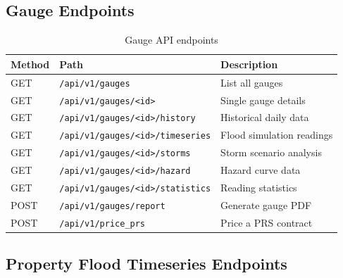 \documentclass[11pt,a4paper]{article}
\begin{document}
\subsection{Gauge Endpoints}

\begin{table}[H]
    \centering
    \caption{Gauge API endpoints}
    \begin{tabular}{@{}lll@{}}
        \toprule
        \textbf{Method} & \textbf{Path} & \textbf{Description} \\
        \midrule
        GET  & \texttt{/api/v1/gauges}                       & List all gauges \\
        GET  & \texttt{/api/v1/gauges/<id>}                   & Single gauge details \\
        GET  & \texttt{/api/v1/gauges/<id>/history}           & Historical daily data \\
        GET  & \texttt{/api/v1/gauges/<id>/timeseries}        & Flood simulation readings \\
        GET  & \texttt{/api/v1/gauges/<id>/storms}            & Storm scenario analysis \\
        GET  & \texttt{/api/v1/gauges/<id>/hazard}            & Hazard curve data \\
        GET  & \texttt{/api/v1/gauges/<id>/statistics}        & Reading statistics \\
        POST & \texttt{/api/v1/gauges/report}                 & Generate gauge PDF \\
        POST & \texttt{/api/v1/price\_prs}                    & Price a PRS contract \\
        \bottomrule
    \end{tabular}
\end{table}

\subsection{Property Flood Timeseries Endpoints}
\end{document}
